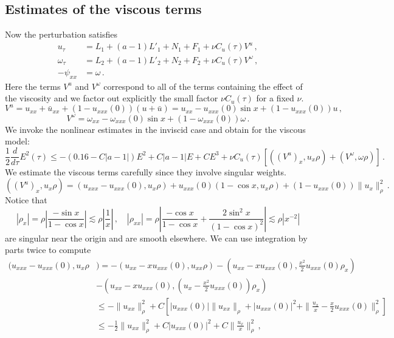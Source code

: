 \documentclass[12pt]{caltech_thesis}
\numberwithin{equation}{section}
\begin{document}
       \subsection{Estimates of the viscous terms}
    Now the perturbation satisfies 
     \begin{equation}
\label{1drcv}
\begin{aligned}
{u}_{ \tau} &=L_1+(a-1)L'_1+N_1+F_1+\nu C_u(\tau)V^u\,, \\
{\omega}_{ \tau}&=L_2+(a-1)L'_2+N_2+F_2+\nu C_u(\tau)V^\omega\,, \\
-{\psi}_{xx} &={\omega}\,.
\end{aligned}
\end{equation}
Here the terms $V^u$ and $V^\omega$ correspond  to all of the terms containing the effect of the viscosity and we factor out explicitly the small factor $\nu C_u(\tau)$ for a fixed $\nu$. $$V^u=u_{xx}+\bar{u}_{xx}+(1-u_{xxx}(0))(u+\bar{u})=u_{xx}-u_{xxx}(0)\sin x +(1-u_{xxx}(0))u\,,$$$$V^\omega=\omega_{xx}-\omega_{xxx}(0)\sin x +(1-\omega_{xxx}(0))\omega\,.$$
    We invoke the  nonlinear estimates in the inviscid case and obtain for the viscous model:
\begin{equation}
\label{l2-unvis}
    \frac{1}{2}\frac{d}{d\tau}E^2(\tau)\leq -(0.16-C|a-1|)E^2+C|a-1|E+CE^3+\nu C_u(\tau)[((V^u)_x,u_x\rho)+(V^\omega,\omega\rho)]\,.
\end{equation}
    We estimate the viscous terms carefully since they involve singular weights. $$
   ((V^u)_x,u_x\rho)=(u_{xxx}-u_{xxx}(0),u_x{\rho})+u_{xxx}(0)(1-\cos x,u_x{\rho})+(1-u_{xxx}(0))\|u_x\|^2_{\rho}\,.
    $$
    Notice that $$|\rho_x|=\rho \left |\frac{-\sin x}{1-\cos x}\right | \lesssim \rho |\frac{1}{x}|\,, \quad |\rho_{xx}|=\rho \left |\frac{-\cos x}{1-\cos x}+\frac{2\sin^2 x}{(1-\cos x)^2} \right |\lesssim \rho |x^{-2}|$$ are singular near the origin and are smooth elsewhere. We can
use integration by parts twice to compute $$\begin{aligned}(u_{xxx}-u_{xxx}(0),u_x{\rho}&)=-(u_{xx}-xu_{xxx}(0),u_{xx}{\rho})-(u_{xx}-xu_{xxx}(0),\frac{x^2}{2}u_{xxx}(0){\rho_x})\\&-(u_{xx}-xu_{xxx}(0),(u_{x}-\frac{x^2}{2}u_{xxx}(0)){\rho_x})\\&\leq -\|u_{xx}\|^2_{\rho}+C[|u_{xxx}(0)|\|u_{xx}\|_{\rho}+|u_{xxx}(0)|^2+\|\frac{u_x}{x}-\frac{x}{2}u_{xxx}(0)\|_{\rho}^2]\\&\leq -\frac{1}{2}\|u_{xx}\|^2_{\rho}+C|u_{xxx}(0)|^2+C\|\frac{u_x}{x}\|_{\rho}^2\,,\end{aligned}$$
\end{document}
